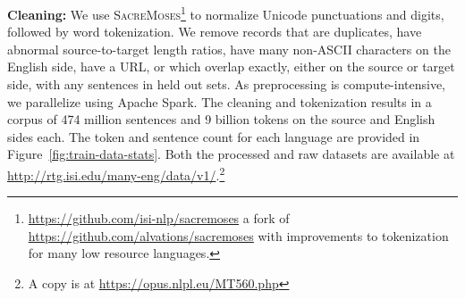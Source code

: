 \textbf{Cleaning:}
 We use \textsc{SacreMoses}\footnote{\url{https://github.com/isi-nlp/sacremoses} a fork of \url{https://github.com/alvations/sacremoses} with improvements to tokenization for many low resource languages.} to normalize Unicode punctuations and digits, followed by word tokenization. 
We remove records that are duplicates, have abnormal source-to-target length ratios, have many non-ASCII characters on the English side, have a URL, or which overlap exactly, either on the source or target side, with any sentences in held out sets.
As preprocessing is compute-intensive, we parallelize using Apache Spark.
The cleaning and tokenization results in a corpus of 474 million sentences and 9 billion tokens on the source and English sides each. The token and sentence count for each language are provided in Figure~\ref{fig:train-data-stats}.
Both the processed and raw datasets are available at \url{http://rtg.isi.edu/many-eng/data/v1/}.\footnote{A copy is at \url{https://opus.nlpl.eu/MT560.php}}

